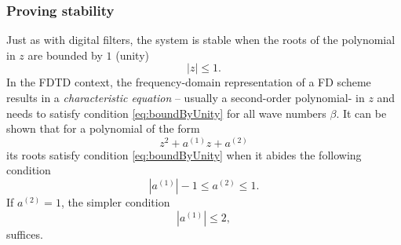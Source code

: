{{\subsubsection{Proving stability}
Just as with digital filters, the system is stable when the roots of the polynomial in $z$ are bounded by $1$ (unity)
\begin{equation}\label{eq:boundByUnity}
    |z| \leq 1.
\end{equation} 
In the FDTD context, the frequency-domain representation of a FD scheme results in a \textit{characteristic equation} -- usually a second-order polynomial- in $z$ and needs to satisfy condition \eqref{eq:boundByUnity} for all wave numbers $\beta$.
It can be shown that for a polynomial of the form 
\begin{equation}\label{eq:polynomialForm}
    z^2 + a^{(1)}z + a^{(2)}
\end{equation} 
its roots satisfy condition \eqref{eq:boundByUnity} when it abides the following condition \cite{theBible}
\begin{equation}\label{eq:condition214}
    |a^{(1)}| - 1 \leq a^{(2)} \leq 1.
\end{equation}
If $a^{(2)} = 1$, the simpler condition
\begin{equation}\label{eq:simplerCondition215}
    |a^{(1)}|\leq 2,
\end{equation}
suffices. 

}}
